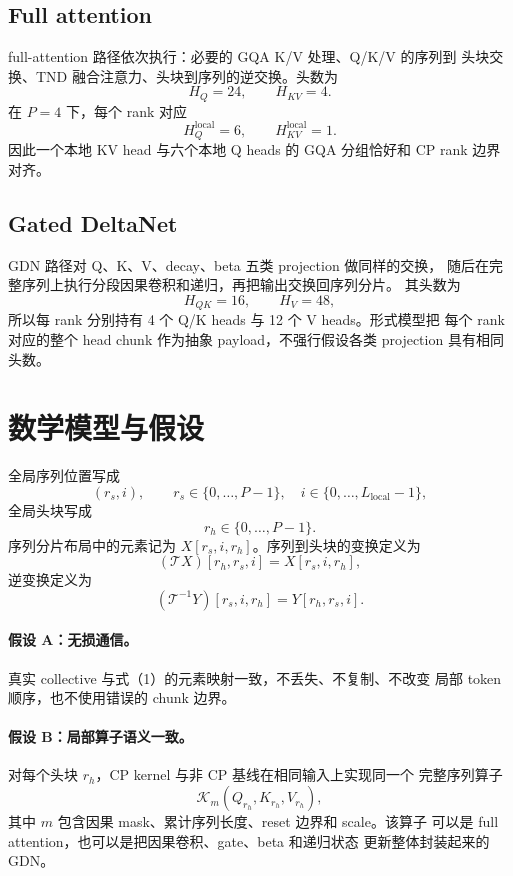 \documentclass[11pt,a4paper]{ctexart}
\newcommand{\Tmap}{\mathcal T}
\newcommand{\Kernel}{\mathcal K}
\begin{document}
\subsection{Full attention}

full-attention 路径依次执行：必要的 GQA K/V 处理、Q/K/V 的序列到
头块交换、TND 融合注意力、头块到序列的逆交换。头数为
\[
H_Q=24,\qquad H_{KV}=4.
\]
在 $P=4$ 下，每个 rank 对应
\[
H_Q^{\mathrm{local}}=6,\qquad H_{KV}^{\mathrm{local}}=1.
\]
因此一个本地 KV head 与六个本地 Q heads 的 GQA 分组恰好和 CP rank
边界对齐。

\subsection{Gated DeltaNet}

GDN 路径对 Q、K、V、decay、beta 五类 projection 做同样的交换，
随后在完整序列上执行分段因果卷积和递归，再把输出交换回序列分片。
其头数为
\[
H_{QK}=16,\qquad H_V=48,
\]
所以每 rank 分别持有 4 个 Q/K heads 与 12 个 V heads。形式模型把
每个 rank 对应的整个 head chunk 作为抽象 payload，不强行假设各类
projection 具有相同头数。

\section{数学模型与假设}

全局序列位置写成
\[
(r_s,i),\qquad r_s\in\{0,\ldots,P-1\},\quad
i\in\{0,\ldots,L_{\mathrm{local}}-1\},
\]
全局头块写成
\[
r_h\in\{0,\ldots,P-1\}.
\]
序列分片布局中的元素记为 $X[r_s,i,r_h]$。序列到头块的变换定义为
\[
(\Tmap X)[r_h,r_s,i]=X[r_s,i,r_h], \tag{1}
\]
逆变换定义为
\[
(\Tmap^{-1}Y)[r_s,i,r_h]=Y[r_h,r_s,i]. \tag{2}
\]

\paragraph{假设 A：无损通信。}
真实 collective 与式（1）的元素映射一致，不丢失、不复制、不改变
局部 token 顺序，也不使用错误的 chunk 边界。

\paragraph{假设 B：局部算子语义一致。}
对每个头块 $r_h$，CP kernel 与非 CP 基线在相同输入上实现同一个
完整序列算子
\[
\Kernel_m(Q_{r_h},K_{r_h},V_{r_h}),
\]
其中 $m$ 包含因果 mask、累计序列长度、reset 边界和 scale。该算子
可以是 full attention，也可以是把因果卷积、gate、beta 和递归状态
更新整体封装起来的 GDN。
\end{document}
